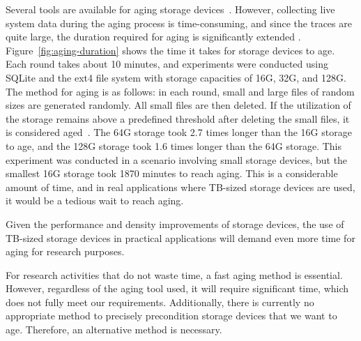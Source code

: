 Several tools are available for aging storage devices~\cite{tbbt:fast05, impressions:fast09, conway:login17}.
However, collecting live system data during the aging process is time-consuming, and since the traces are quite large, the duration required for aging is significantly extended \cite{fs-aging:sigmetrics97}.
Figure~\ref{fig:aging-duration} shows the time it takes for storage devices to age. 
Each round takes about 10 minutes, and experiments were conducted using SQLite and the ext4 file system with storage capacities of 16G, 32G, and 128G.
The method for aging is as follows: in each round, small and large files of random sizes are generated randomly. 
All small files are then deleted. If the utilization of the storage remains above a predefined threshold after deleting the small files, it is considered aged~\cite{Problem_in_SSD_Empirical}.
The 64G storage took 2.7 times longer than the 16G storage to age, and the 128G storage took 1.6 times longer than the 64G storage. 
This experiment was conducted in a scenario involving small storage devices, but the smallest 16G storage took 1870 minutes to reach aging. 
This is a considerable amount of time, and in real applications where TB-sized storage devices are used, it would be a tedious wait to reach aging.

Given the performance and density improvements of storage devices, the use of TB-sized storage devices in practical applications will demand even more time for aging for research purposes.


For research activities that do not waste time, a fast aging method is essential.
However, regardless of the aging tool used, it will require significant time, which does not fully meet our requirements.
Additionally, there is currently no appropriate method to precisely precondition storage devices that we want to age.
Therefore, an alternative method is necessary.

